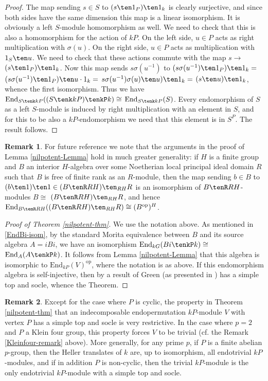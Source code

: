 \documentclass{amsart}
\theoremstyle{plain}\newtheorem{Theorem}{Theorem}[section]
\theoremstyle{plain}\newtheorem{Conjecture}[Theorem]{Conjecture}
\theoremstyle{plain}\newtheorem{Corollary}[Theorem]{Corollary}
\theoremstyle{plain}\newtheorem{Lemma}[Theorem]{Lemma}
\theoremstyle{plain}\newtheorem{Proposition}[Theorem]{Proposition}
\theoremstyle{definition}\newtheorem{Definition}[Theorem]{Definition}
\theoremstyle{definition}\newtheorem{Example}[Theorem]{Example}
\theoremstyle{definition}\newtheorem{Examples}[Theorem]{Examples}
\theoremstyle{definition}\newtheorem{Exercise}[Theorem]{Exercise}
\theoremstyle{definition}\newtheorem{Notation}[Theorem]{Notation}
\theoremstyle{definition}\newtheorem{Remark}[Theorem]{Remark}
\theoremstyle{definition}\newtheorem{Remarks}[Theorem]{Remarks}
\theoremstyle{plain}\newtheorem{Statement}[Theorem]{}
\def\End{\mathrm{End}}
\def\op{\mathrm{op}}
\begin{document}
\begin{proof}
The map sending $s\in S$ to $(s\ten 1_P)\ten 1_k$ is clearly surjective, and since
both sides have the same dimension this map is a linear isomorphism. It is
obviously a left $S$-module homomorphism as well. We need to check that
this is also a homomorphism for the action of $kP$. On the left side, $u\in P$ 
acts as right multiplication with $\sigma(u)$. On the right side, $u\in P$ acts
as multiplication with $1_S\ten u$.  We need to check that these actions commute
with the map $s\to$ $(s\ten 1_P)\ten 1_k$. Now this map sends $s\sigma(u^{-1})$ to
$(s\sigma(u^{-1}) \ten 1_P)\ten 1_k=$ $(s\sigma(u^{-1}) \ten 1_P)\ten u\cdot 1_k=$
$s\sigma(u^{-1})\sigma(u)\ten u)\ten 1_k=$ $(s\ten u)\ten 1_k$, whence the first
isomorphism. Thus we have $\End_{S\tenk kP}((S\tenk kP) \tenkP k) \cong $
$\End_{S\tenk kP}(S)$. Every endomorphism of $S$ as a left $S$-module is
induced by right multiplication with an element in $S$, and for this to be also
a $kP$-endomorphism we need that this element is in $S^P$. The result follows.
\end{proof} 

\begin{Remark}
For future reference we note that the arguments in the proof of Lemma
\ref{nilpotent-Lemma} hold in much greater generality: if $H$ is a finite group
and $B$ an interior $H$-algebra over some Noetherian local principal ideal domain
$R$ such that $B$ is free of finite rank as an $R$-module, 
then the map sending $b\in B$ to $(b\ten 1)\ten 1\in (B\tenR RH)\ten_{RH} R$
is an isomorphism of $B\tenR RH$-modules $B\cong$ $(B\tenR RH)\ten_{RH} R$,
and hence $\End_{B\tenR RH}((B\tenR RH)\ten_{RH} R)\cong (B^\op)^H$.
\end{Remark}

\begin{proof}[Proof of Theorem \ref{nilpotent-thm}]
We use the notation above. As mentioned in \ref{EndBi-isom}, by
the standard Morita equivalence between
$B$ and its source algebra $A=iBi$, we have an isomorphism
$\End_{kG}(Bi\tenkP k)\cong$ $\End_A(A\tenkP k)$. It follows from
Lemma \ref{nilpotent-Lemma} that this algebra is isomorphic to
$\End_{kP}(V)^\op$, where the notation is as above. 
If this  endomorphism  algebra is self-injective, then by a result of Green 
(as presented in \cite[Theorem 2.13]{Geck01}) has a simple top and socle, 
whence the Theorem.
\end{proof}

\begin{Remark}
Except for the case where $P$ is cyclic, the property in Theorem \ref{nilpotent-thm}
 that an indecomposable
endopermutation $kP$-module $V$ with vertex $P$ has a simple top and socle is
very restrictive. In the case where $p=2$ and $P$ a Klein four group, this property
forces  $V$ to be  trivial (cf. the Remark \ref{Kleinfour-remark} above).  More generally,
for any prime $p$, if 
$P$ is a finite abelian $p$-group, then the Heller translates of $k$ are, up to
isomorphism, all endotrivial $kP$-modules, and if in addition $P$ is non-cyclic, then
the trivial $kP$-module is the only endotrivial $kP$-module with a simple top and 
socle. 
\end{Remark}
\end{document}
